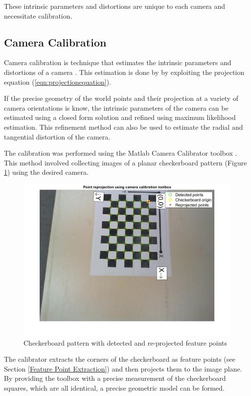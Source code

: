\documentclass{UoNMCHA}
\numberwithin{equation}{section}
\begin{document}
These intrinsic parameters and distortions are unique to each camera and necessitate calibration. 

\subsection{Camera Calibration}\label{Camera Calibration}

Camera calibration is technique that estimates the intrinsic parameters and distortions of a camera \cite{zhang}. This estimation is done by  by exploiting the projection equation (\ref{eqn:projectionequation}).\

If the precise geometry of the world points and their projection at a variety of camera orientations is know, the intrinsic parameters of the camera can be estimated using a closed form solution and refined using maximum likelihood estimation. This refinement method can also be used to estimate the radial and tangential distortion of the camera.\

The calibration was performed using the Matlab Camera Calibrator toolbox \citep{bouguet2004camera}. This method involved collecting images of a planar checkerboard pattern (Figure \ref{fig:checkerboardpattern}) using the desired camera. 


\begin{figure}[H]
	\begin{center}
		\includegraphics[width=.5\linewidth]{Figures/CalibrationImageExample}
		\caption{Checkerboard pattern with detected and re-projected feature points}
		\label{fig:checkerboardpattern}
	\end{center}
\end{figure}

The calibrator extracts the corners of the checkerboard as feature points (see Section \ref{Feature Point Extraction}) and then projects them to the image plane. By providing the toolbox with a precise measurement of the checkerboard squares, which are all identical, a precise geometric model can be formed.
\end{document}
